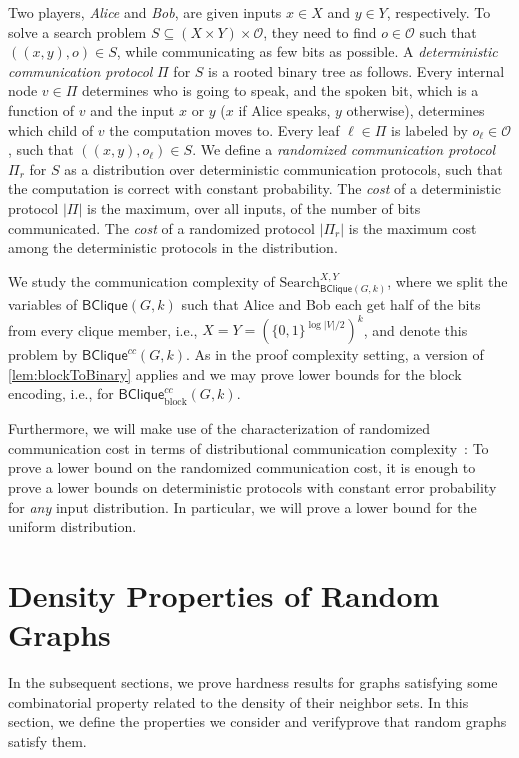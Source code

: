 \documentclass[10pt,a4paper]{article}
\theoremstyle{definition}
\theoremstyle{remark}
\theoremstyle{example}
\theoremstyle{plain}
\newcommand{\search}{\mathrm{Search}}
\newcommand{\protocolPi}{\Pi}
\newcommand{\protocolPiRand}{\Pi_r}
\newcommand{\commCost}[1]{\lvert#1\rvert}
\newcommand{\setsize}[1]{\lvert#1\rvert}
\newcommand{\binClique}[2]{\mathsf{BClique}({#1}, {#2})}
\newcommand{\binCliqueGk}{\binClique{G}{k}}
\newcommand{\searchComm}[1]{\mathsf{BClique}^{cc}({#1}, k)}
\newcommand{\binCliqueBlockComm}[2]
{\mathsf{BClique}_{\textrm{block}}^{cc}(#1,#2)}
\begin{document}
Two players, \emph{Alice} and \emph{Bob}, 
are given inputs $x\in X$ and $y\in Y$, respectively. 
To solve a search problem $S\subseteq (X \times Y) \times \mathcal{O}$, they need to find $o\in \mathcal{O}$ such that $((x,y),o)\in S$, 
while communicating as few bits as possible. 
A \emph{deterministic communication protocol} $\protocolPi$ for $S$ is a rooted binary tree as follows. Every internal node $v\in\protocolPi$ determines who is going to speak, and the spoken bit, which is a function of $v$ and the input $x$ or $y$ ($x$ if Alice speaks, $y$ otherwise), determines which child of $v$ the computation moves to. Every leaf $\ell \in \protocolPi$ is labeled by $o_{\ell} \in \mathcal{O}$, such that $((x,y),o_{\ell})\in S$.
We define a \emph{randomized communication protocol} $\protocolPiRand$ for $S$ as a distribution over deterministic communication protocols, such that the computation is correct with constant probability.
The \emph{cost} of a deterministic protocol $\commCost{\protocolPi}$ is the maximum, over all inputs, of the number of bits communicated. 
The \emph{cost} of a randomized protocol $\commCost{\protocolPiRand}$ is the maximum cost among the deterministic protocols in the distribution.

We study the communication complexity of $\search^{X,Y}_{\binCliqueGk}$, where we split the variables of $\binCliqueGk$ such that Alice and Bob each get half of the bits from every clique member, i.e., $X=Y=(\{0,1\}^{\log \setsize{V}/2})^k$, and denote this problem by $\searchComm{G}$. 
As in the proof complexity setting, a version of \autoref{lem:blockToBinary} applies and we may prove lower bounds for the block encoding, i.e., for $\binCliqueBlockComm{G}{k}$. 

Furthermore, we will make use of the characterization of randomized communication cost in terms of distributional communication complexity~\cite{yao83}: To prove a lower bound on the randomized communication cost, it is enough to prove a lower bounds on deterministic protocols with constant error probability for \emph{any} input distribution. 
In particular, we will prove a lower bound for the uniform distribution.
\section{Density Properties of Random Graphs}
\label{sec:density-properties}

In the subsequent sections, we prove hardness results for graphs satisfying some combinatorial property related to the density of their neighbor sets.  
In this section, we define the properties we consider and 
{verify}{prove} that random graphs satisfy them. 
\end{document}

